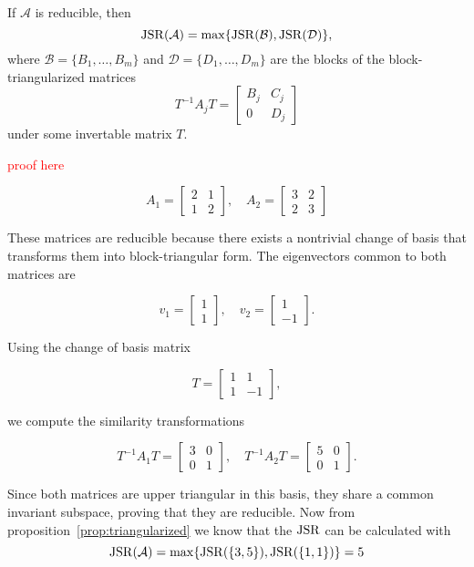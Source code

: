 \begin{proposition}
    \label{prop:triangularized}
    If $\mathcal{A}$ is reducible, then 
    \begin{equation}
        \operatorname{JSR}(\mathcal{A}) = \max \{ \operatorname{JSR}(\mathcal{B}), \operatorname{JSR}(\mathcal{D}) \},
    \end{equation}
    where $\mathcal{B} = \{B_1,\dots, B_m\}$ and $\mathcal{D} = \{D_1,\dots, D_m\}$ are the blocks of the block-triangularized matrices
    \[
        T^{-1}A_jT = 
        \begin{bmatrix}
        B_j & C_j \\
        0   & D_j 
        \end{bmatrix}
    \]
    under some invertable matrix $T$. 
\end{proposition}
\textcolor{red}{proof here}
\begin{example}
    \[
    A_1 = \begin{bmatrix} 2 & 1 \\ 1 & 2 \end{bmatrix}, \quad
    A_2 = \begin{bmatrix} 3 & 2 \\ 2 & 3 \end{bmatrix}
    \]

    These matrices are reducible because there exists a nontrivial change of basis that transforms them into block-triangular form. The eigenvectors common to both matrices are

    \[
    v_1 = \begin{bmatrix} 1 \\ 1 \end{bmatrix}, \quad
    v_2 = \begin{bmatrix} 1 \\ -1 \end{bmatrix}.
    \]

    Using the change of basis matrix

    \[
    T = \begin{bmatrix} 1 & 1 \\ 1 & -1 \end{bmatrix},
    \]

    we compute the similarity transformations

    \[
    T^{-1} A_1 T = \begin{bmatrix} 3 & 0 \\ 0 & 1 \end{bmatrix}, \quad
    T^{-1} A_2 T = \begin{bmatrix} 5 & 0 \\ 0 & 1 \end{bmatrix}.
    \]

    Since both matrices are upper triangular in this basis, they share a common invariant subspace, proving that they are reducible.
    Now from proposition~\ref{prop:triangularized} we know that the $\operatorname{JSR}$ can be calculated with 
    \[ 
    \operatorname{JSR}(\mathcal{A}) = \max \{ \operatorname{JSR}(\{3,5\}), \operatorname{JSR}(\{1,1\})\} = 5
    \]
\end{example}

